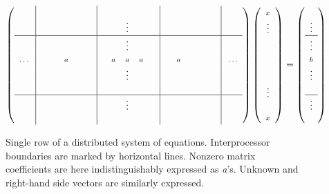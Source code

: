 \begin{figure}
\begin{center}
\newcommand{\qq}{\scriptstyle}
\renewcommand{\arraycolsep}{4 pt}
\renewcommand{\arraystretch}{0.5}
\begin{equation}
\left(
\begin{array}{ c|c c c c c|c c c c c|c c c c c|c }
 & & & & & & & &\qq \; & & & & & & & & \\
 & & & & & & & &\qq \vdots & & & & & & & & \\
\hline
 & & & & & & & &\qq \vdots & & & & & & & & \\
\qq .\,.\,.\; &\qq \; &\qq \; &\qq a &\qq \; &\qq \; &
\qq \! & \qq a &\qq a &\qq a &\qq \; &
\qq \; &\qq a &\qq \; &\qq \; &\qq \; &\qq \; .\,.\,.\\
 & & & & & & & &\qq \vdots & & & & & & & & \\
 & & & & & & & &\qq \; & & & & & & & & \\
\hline
 & & & & & & & &\qq \vdots & & & & & & & \\
 & & & & & & & &\qq \; & & & & & & & & \\
\end{array}
\right)
\left(
\begin{array}{c}
\qq x \\
\qq \vdots \\
\\
\\
\\
\\
\qq \vdots \\
\\
\qq x \\
\end{array}
\right)
=
\left(
\begin{array}{c}
\qq \;\\
\qq \vdots \\
\hline
\qq \vdots \\
\qq b \\
\qq \vdots \\
\qq \;\\
\hline
\qq \vdots \\
\qq \; \\
\end{array}
\right)
\end{equation}
\caption{Single row of a distributed system of equations.
Interprocessor boundaries are marked by horizontal lines.
Nonzero matrix coefficients are here indistinguishably
expressed as {\itshape a}'s.  Unknown and right-hand side
vectors are similarly expressed.}
\end{center}
\end{figure}

